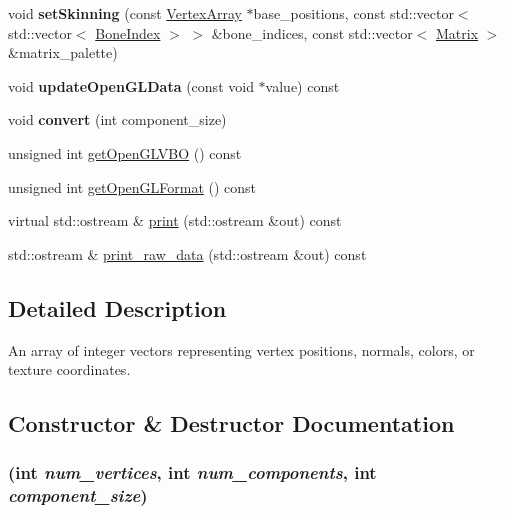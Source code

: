 \begin{CompactItemize}
\item 
\hypertarget{classm3g_1_1VertexArray_fcfcc1258ce0be7d0322d2e00809e1ea}{
void \textbf{setSkinning} (const \hyperlink{classm3g_1_1VertexArray}{VertexArray} $\ast$base\_\-positions, const std::vector$<$ std::vector$<$ \hyperlink{structm3g_1_1BoneIndex}{BoneIndex} $>$ $>$ \&bone\_\-indices, const std::vector$<$ \hyperlink{classm3g_1_1Matrix}{Matrix} $>$ \&matrix\_\-palette)}
\label{classm3g_1_1VertexArray_fcfcc1258ce0be7d0322d2e00809e1ea}

\item 
\hypertarget{classm3g_1_1VertexArray_f5518d17b77d25b05dc0b943b30a2fc0}{
void \textbf{updateOpenGLData} (const void $\ast$value) const }
\label{classm3g_1_1VertexArray_f5518d17b77d25b05dc0b943b30a2fc0}

\item 
\hypertarget{classm3g_1_1VertexArray_5c2359d08265a9f8605316789c40ece4}{
void \textbf{convert} (int component\_\-size)}
\label{classm3g_1_1VertexArray_5c2359d08265a9f8605316789c40ece4}

\item 
unsigned int \hyperlink{classm3g_1_1VertexArray_720ecee697dbf11d5f90dc998817b39d}{getOpenGLVBO} () const 
\item 
unsigned int \hyperlink{classm3g_1_1VertexArray_3e28ae5596cde78a980de02005a136f2}{getOpenGLFormat} () const 
\item 
virtual std::ostream \& \hyperlink{classm3g_1_1VertexArray_6fea17fa1532df3794f8cb39cb4f911f}{print} (std::ostream \&out) const 
\item 
std::ostream \& \hyperlink{classm3g_1_1VertexArray_85d61f1cdd10b3b5126cdb20291ae276}{print\_\-raw\_\-data} (std::ostream \&out) const 
\end{CompactItemize}


\subsection{Detailed Description}
An array of integer vectors representing vertex positions, normals, colors, or texture coordinates. 

\subsection{Constructor \& Destructor Documentation}
\hypertarget{classm3g_1_1VertexArray_5f38e30d23b5dc34b223e749e8afd0d0}{
\subsubsection[{VertexArray}]{ (int {\em num\_\-vertices}, \/  int {\em num\_\-components}, \/  int {\em component\_\-size})}}
\label{classm3g_1_1VertexArray_5f38e30d23b5dc34b223e749e8afd0d0}


